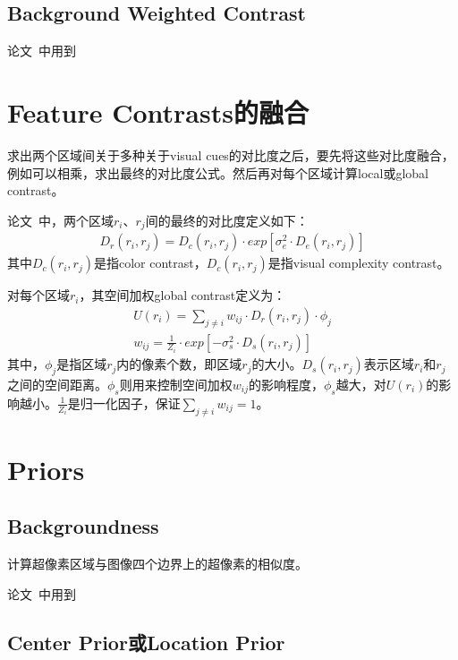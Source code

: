 \documentclass[12pt]{article}
\begin{document}
\subsection{Background Weighted Contrast}

论文~\cite{zhu2014saliency}中用到

\section{Feature Contrasts的融合}

求出两个区域间关于多种关于visual cues的对比度之后，要先将这些对比度融合，例如可以相乘，求出最终的对比度公式。然后再对每个区域计算local或global contrast。

论文~\cite{zhu2014tag}中，两个区域$r_i$、$r_j$间的最终的对比度定义如下：
\begin{align}
D_r(r_i, r_j) = D_c(r_i, r_j) \cdot exp[\sigma_e^2 \cdot D_e(r_i, r_j)]
\end{align}
其中$D_c(r_i, r_j)$是指color contrast，$D_c(r_i, r_j)$是指visual complexity contrast。

对每个区域$r_i$，其空间加权global contrast定义为：
\begin{align}
U(r_i) = \sum_{j\ne i}w_{ij} \cdot D_r(r_i, r_j) \cdot \phi_j\\
w_{ij} = \frac{1}{Z_i}\cdot exp[-\sigma_s^2 \cdot D_s(r_i, r_j)]
\end{align}
其中，$\phi_j$是指区域$r_j$内的像素个数，即区域$r_j$的大小。$D_s(r_i, r_j)$表示区域$r_i$和$r_j$之间的空间距离。$\phi_s$则用来控制空间加权$w_{ij}$的影响程度，$\phi_s$越大，对$U(r_i)$的影响越小。$\frac{1}{Z_i}$是归一化因子，保证$\sum_{j \ne i}w_{ij} = 1$。


\section{Priors}

\subsection{Backgroundness}

计算超像素区域与图像四个边界上的超像素的相似度。

论文~\cite{lu2014learning}中用到

\subsection{Center Prior或Location Prior}
\end{document}
